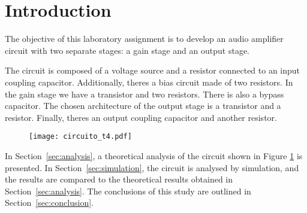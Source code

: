 \section{Introduction}
\label{sec:introduction}

The objective of this laboratory assignment is to develop an audio amplifier circuit with two separate stages: a gain stage and an output stage.

The circuit is composed of a voltage source and a resistor connected to an input coupling capacitor. Additionally, theres a bias circuit made of two resistors. In the gain stage we have a transistor and two resistors. There is also a bypass capacitor. The chosen architecture of the output stage is a transistor and a resistor. Finally, theres an output coupling capacitor and another resistor.

\begin{figure}[h]
\centering
  \texttt{[image: circuito\_t4.pdf]}
  \label{fig:circuito_t4}
\end{figure}

In Section~\ref{sec:analysis}, a theoretical analysis of the circuit shown in Figure \ref{fig:circuito_t4}  is
presented. In Section~\ref{sec:simulation}, the circuit is analysed by
simulation, and the results are compared to the theoretical results obtained in
Section~\ref{sec:analysis}. The conclusions of this study are outlined in
Section~\ref{sec:conclusion}.
